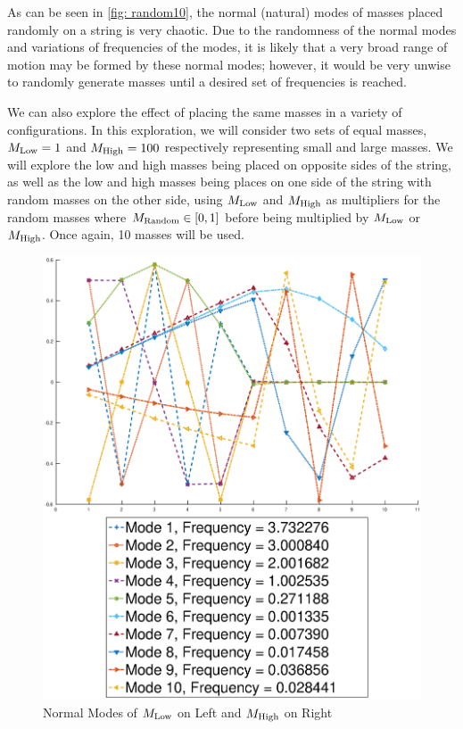 \documentclass[10pt,a4paper]{article}
\begin{document}
\begin{multicols*}{2}
As can be seen in \cref{fig: random10}, the normal (natural) modes of masses placed randomly on a string is very chaotic. Due to the randomness of the normal modes and variations of frequencies of the modes, it is likely that a very broad range of motion may be formed by these normal modes; however, it would be very unwise to randomly generate masses until a desired set of frequencies is reached.

We can also explore the effect of placing the same masses in a variety of configurations. In this exploration, we will consider two sets of equal masses, $M_{\rm{Low}} = 1$ and $M_{\rm{High}} = 100$ respectively representing small and large masses. We will explore the low and high masses being placed on opposite sides of the string, as well as the low and high masses being places on one side of the string with random masses on the other side, using $M_{\rm{Low}}$ and $M_{\rm{High}}$ as multipliers for the random masses where $M_{\rm{Random}} \in \left[0,1\right]$ before being multiplied by $M_{\rm{Low}}$ or $M_{\rm{High}}$. Once again, 10 masses will be used.

\begin{figure}[H]
	\includegraphics[width=\columnwidth]{figures/low-high}
	\caption{Normal Modes of $M_{\rm{Low}}$ on Left and $M_{\rm{High}}$ on Right}
	\label{fig: low-high}
\end{figure}


\end{multicols*}
\end{document}
